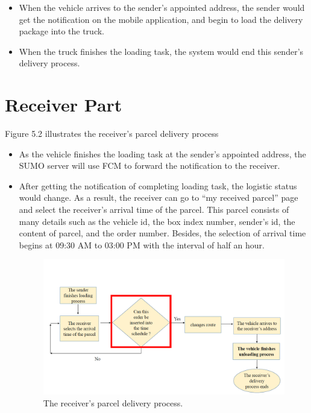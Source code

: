 \documentclass[12pt]{ksthesis}
\begin{document}
\begin{thesis}
{\begin{itemize}
\item
When the vehicle arrives to the sender’s appointed address, the sender would get the notification on the mobile application, and begin to load the delivery package into the truck.

\item
When the truck finishes the loading task, the system would end this sender’s delivery process.

\end{itemize}







\section{Receiver Part}


Figure 5.2 illustrates the receiver’s parcel delivery process

\begin{itemize}
\item
As the vehicle finishes the loading task at the sender’s appointed address, the SUMO server will use FCM to forward the notification to the receiver.

\item
After getting the notification of completing loading task, the logistic status would change. As a result, the receiver can go to “my received parcel” page and select the receiver’s arrival time of the parcel. This parcel consists of many details such as the vehicle id, the box index number, sender’s id, the content of parcel, and the order number. Besides, the selection of arrival time begins at 09:30 AM to 03:00 PM with the interval of half an hour.

\begin{figure}[H]
\centering
\includegraphics[scale=0.45]{./Thesis_figures/F5-2_receiver_delivery_process.PNG}
\caption{\large The receiver's parcel delivery process.}
\vspace{0.5cm}
\label{Fig:receiver_process}
\end{figure}


\end{itemize}}
\end{thesis}
\end{document}
